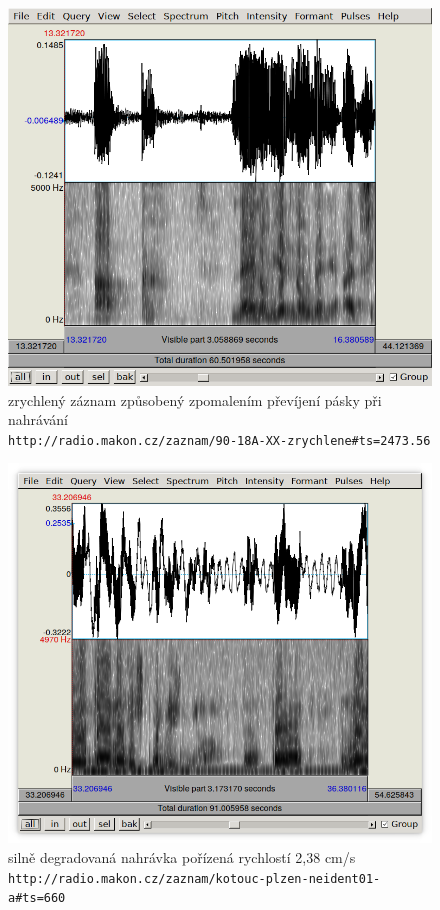 
\begin{figure}[htpb]
\includegraphics[scale=0.89]{rc/spectrum-accel-90-18A.png}
\caption{
    zrychlený záznam způsobený zpomalením převíjení pásky při nahrávání\\
    \texttt{http://radio.makon.cz/zaznam/90-18A-XX-zrychlene\#ts=2473.56}
}
\label{fig:spectr-accel}
\end{figure}

\begin{figure}[htpb]
\includegraphics[scale=0.89]{rc/spectrum-2cms-ktplzneid01a.png}
\caption{
    silně degradovaná nahrávka pořízená rychlostí 2,38 cm/s\\
    \texttt{http://radio.makon.cz/zaznam/kotouc-plzen-neident01-a\#ts=660}
}
\label{fig:spectr-2cms}
\end{figure}

